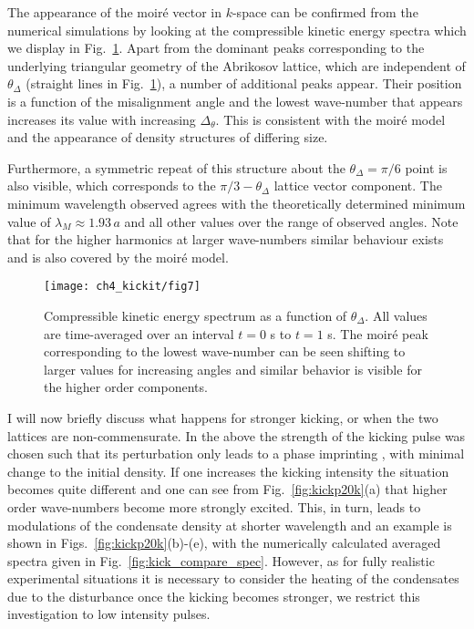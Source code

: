     The appearance of the moir\'e vector in $k$-space can be confirmed from the numerical simulations by looking at the compressible kinetic energy spectra which we display in Fig.~\ref{fig:dtheta_kspec}. Apart from the dominant peaks corresponding to the underlying triangular geometry of the Abrikosov lattice, which are independent of $\theta_\Delta$ (straight lines in Fig.~\ref{fig:dtheta_kspec}), a number of additional peaks appear. Their position is a function of the misalignment angle and the lowest wave-number that appears increases its value with increasing $\Delta_\theta$. This is consistent with the moir\'e model and the appearance of density structures of differing size.

    Furthermore, a symmetric repeat of this structure about the $\theta_\Delta=\pi/6$ point is also visible, which corresponds to the $\pi/3 - \theta_\Delta$ lattice vector component. The minimum wavelength observed agrees with the theoretically determined minimum value of $\lambda_M\approx 1.93\,a$ and all other values over the range of observed angles. Note that for the higher harmonics at larger wave-numbers similar behaviour exists and is also covered by the moir\'e model.
	\begin{figure}[tb]
        \centering
		\texttt{[image: ch4\_kickit/fig7]}
		\caption{Compressible kinetic energy spectrum as a function of $\theta_\Delta$. All values are time-averaged over an interval $t=0$ s to $t=1$ s. The moir\'e peak corresponding to the lowest wave-number can be seen shifting to larger values for increasing angles and similar behavior is visible for the higher order components.}
		\label{fig:dtheta_kspec}
	\end{figure}

    I will now briefly discuss what happens for stronger kicking, or when the two lattices are non-commensurate. In the above the strength of the kicking pulse was chosen such that its perturbation only leads to a phase imprinting \cite{Vtx:Dobrek_pra_1999,BEC:Denschlag_science_2000}, with minimal change to the initial density. If one increases the kicking intensity the situation becomes quite different and one can see from Fig.~\ref{fig:kickp20k}(a) that higher order wave-numbers become more strongly excited. This, in turn, leads to modulations of the condensate density at shorter wavelength and an example is shown in Figs.~\ref{fig:kickp20k}(b)-(e), with the numerically calculated averaged spectra given in Fig.~\ref{fig:kick_compare_spec}. However, as for fully realistic experimental situations it is necessary to consider the heating of the condensates due to the disturbance once the kicking becomes stronger, we restrict this investigation to low intensity pulses.

